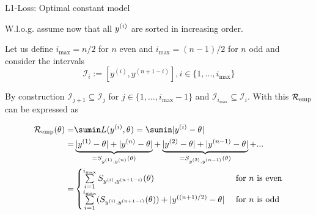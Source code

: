 \documentclass[11pt,compress,t,notes=noshow, xcolor=table]{beamer}
\begin{document}
\begin{frame}{L1-Loss: Optimal constant model}

W.l.o.g. assume now that all $y^{(i)}$ are sorted in increasing order.

Let us define $i_{\max} = n / 2$ for $n$ even and $i_{\max} = (n - 1) / 2$ for $n$ odd and consider the intervals 
$$
\mathcal{I}_i := [y^{(i)},y^{(n+1-i)}], i \in \{1, ..., i_{\max}\}
$$

By construction $\mathcal{I}_{j+1} \subseteq \mathcal{I}_j$ for $j \in \{1,\dots,i_{\max}-1\}$ and $\mathcal{I}_{i_{\max}} \subseteq \mathcal{I}_i$. With this $\mathcal{R}_{\text{emp}}$ can be expressed as
\begin{footnotesize}
\begin{align*}
\riske(\theta) =& \sumin L(\yi,\theta) = \sumin|\yi - \theta| \\ 
=& \underbrace{|\yi[1] - \theta| + |\yi[n] - \theta|}_{= S_{\yi[1], \yi[n]}(\theta)} + \underbrace{|\yi[2] - \theta| + |\yi[n - 1] - \theta|}_{= S_{\yi[2], \yi[n - 1]}(\theta)} + ...  \\
=& \begin{cases} \sum\limits_{i = 1}^{i_{\max}} S_{\yi, \yi[n + 1 - i]}(\theta) & \text{ for } n \text{ is even} \\
\sum\limits_{i = 1}^{i_{\max}} (S_{\yi, \yi[n + 1 - i]}(\theta)) + |\yi[(n + 1)/2] - \theta| & \text{ for } n \text{ is odd} \end{cases}
\end{align*}
\end{footnotesize}

\end{frame}
\end{document}
